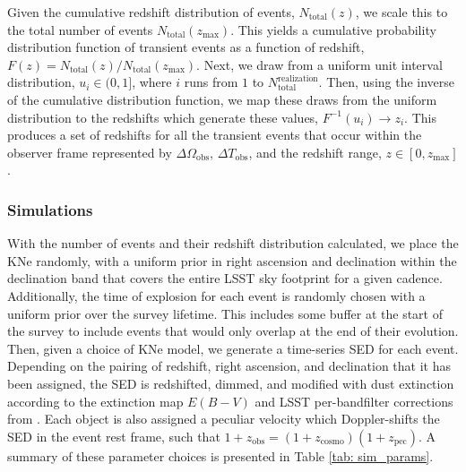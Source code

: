 Given the cumulative redshift distribution of events, $N_{\mathrm{total}}(z)$, we scale this to the total number of events $N_{\mathrm{total}}(z_{\mathrm{max}})$. This yields a cumulative probability distribution function of transient events as a function of redshift, $F(z) = N_{\mathrm{total}}(z)/ N_{\mathrm{total}}(z_{\mathrm{max}})$. Next, we draw from a uniform unit interval distribution, $u_i\in(0,1]$, where $i$ runs from $1$ to $N_{\mathrm{ total}}^{\mathrm{realization}}$. Then, using the inverse of the cumulative distribution function, we map these draws from the uniform distribution to the redshifts which generate these values, $F^{-1}(u_i) \rightarrow z_i$. This produces a set of redshifts for all the transient events that occur within the observer frame represented by $\Delta \Omega_{\mathrm{obs}}$, $\Delta T_{\mathrm{obs}}$, and the redshift range, $z \in [0,z_{\mathrm{max}}]$.

\subsubsection{Simulations}
With the number of events and their redshift distribution calculated, we place the KNe randomly, with a uniform prior in right ascension and declination within the declination band that covers the entire LSST sky footprint for a given cadence. Additionally, the time of explosion for each event is randomly chosen with a uniform prior over the survey lifetime. This includes some buffer at the start of the survey to include events that would only overlap at the end of their evolution. Then, given a choice of KNe model, we generate a time-series SED for each event. Depending on the pairing of redshift, right ascension, and declination that it has been assigned, the SED is redshifted, dimmed, and modified with dust extinction according to the extinction map $E(B-V)$ and LSST per-bandfilter corrections from
\citet{Schlafly2011}. Each object is also assigned a peculiar velocity which Doppler-shifts the SED in the event rest frame, such that $1 + z_{\mathrm{obs}} = (1+z_{\mathrm{cosmo}})(1+z_{\mathrm{pec}})$. A summary of these parameter choices is presented in Table \ref{tab: sim_params}.

\begin{table}[h!]
\centering
{}
 \caption{Parameters used to generate the simulated LSST kilonovae observations.}\label{tab: sim_params}
\end{table}

